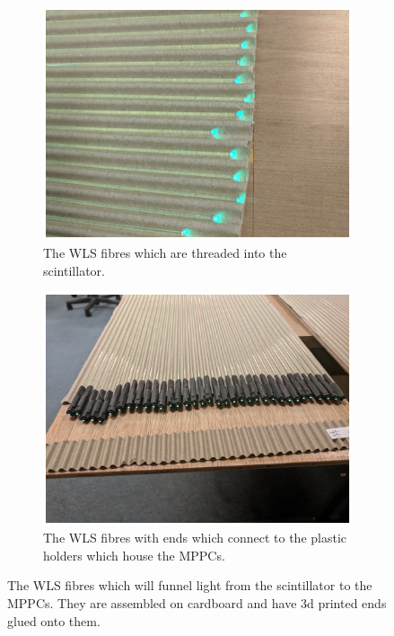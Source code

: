 \begin{figure}[htbp]
\centering
\begin{subfigure}{.5\textwidth}
  \centering
  \includegraphics[width=\linewidth]{Chapter3/Figs/Raster/detCon013b_WlsFibres.png}
  \captionsetup{width=.9\linewidth}
  \caption{The WLS fibres which are threaded into the scintillator.}
  \label{subFig:detCon013b_WlsFibres}
\end{subfigure}%
\begin{subfigure}{.5\textwidth}
  \centering
  \includegraphics[width=\linewidth]{Chapter3/Figs/Raster/detCon014b_WlsWithEnds.png}
  \captionsetup{width=.9\linewidth}
  \caption{The WLS fibres with ends which connect to the plastic holders which house the MPPCs.}
  \label{subFig:detCon014b_WlsWithEnds}
\end{subfigure}
\caption{The WLS fibres which will funnel light from the scintillator to the MPPCs. They are assembled on cardboard and have 3d printed ends glued onto them.}
\label{fig:detCon_WlsFibres_WlsWithEnds}
\end{figure}

